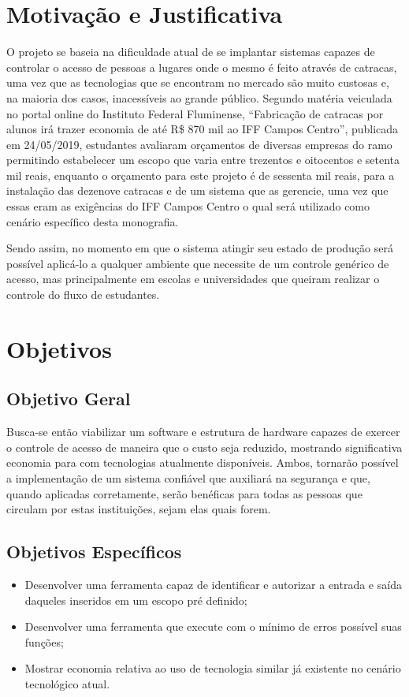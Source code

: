 \section{Motivação e Justificativa}

O projeto se baseia na dificuldade atual de se implantar sistemas capazes de controlar o acesso de pessoas a lugares onde o mesmo é feito através de catracas,
uma vez que as tecnologias que se encontram no mercado são muito custosas e,
na maioria dos casos, inacessíveis ao grande público. Segundo matéria veiculada
no portal online do Instituto Federal Fluminense, “Fabricação de catracas por
alunos irá trazer economia de até R\$ 870 mil ao IFF Campos Centro”, publicada
em 24/05/2019, estudantes avaliaram orçamentos de diversas empresas do ramo permitindo
estabelecer um escopo que varia entre trezentos e oitocentos e setenta mil reais,
enquanto o orçamento para este projeto é de sessenta mil reais, para a instalação
das dezenove catracas e de um sistema que as gerencie, uma vez que essas eram as exigências do IFF Campos Centro o qual será utilizado como cenário específico desta monografia.


Sendo assim, no momento em que o sistema atingir seu estado de produção será possível
aplicá-lo a qualquer ambiente que necessite de um controle genérico de acesso, mas
principalmente em escolas e universidades que queiram realizar o
controle do fluxo de estudantes.

\section{Objetivos}
\subsection{Objetivo Geral}
Busca-se então viabilizar um software e estrutura de hardware capazes de exercer o controle de acesso de maneira que o custo seja reduzido, mostrando significativa economia para com tecnologias atualmente disponíveis. Ambos, tornarão
possível a implementação de um sistema confiável que auxiliará na segurança e que,
quando aplicadas corretamente, serão benéficas para todas as pessoas que circulam
por estas instituições, sejam elas quais forem. 
\subsection{Objetivos Específicos}
\begin{itemize}
    \item Desenvolver uma ferramenta capaz de identificar e autorizar a entrada e saída daqueles
    inseridos em um escopo pré definido;
    \item Desenvolver uma ferramenta que execute com o mínimo de erros possível suas funções;
    \item Mostrar economia relativa ao uso de tecnologia similar já existente no cenário tecnológico atual.
\end{itemize}

